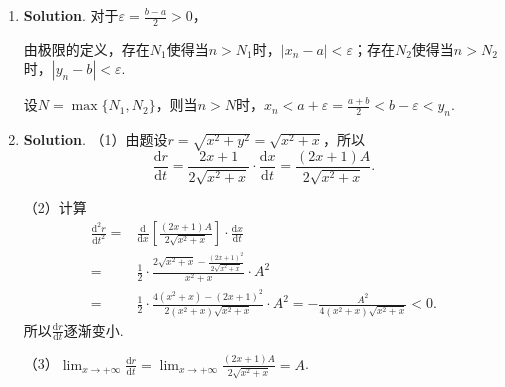 \documentclass[../main.tex]{subfiles}
\begin{document}
\begin{enumerate}
    \item \textbf{Solution}. 对于$\varepsilon=\frac{b-a}{2}>0$，

          由极限的定义，存在$N_{1}$使得当$n>N_{1}$时，$|x_{n}-a|<\varepsilon$；存在$N
                  _{2}$使得当$n>N_{2}$时，$|y_{n}-b|<\varepsilon$.

          设$N=\max\{N_{1},N_{2}\}$，则当$n>N$时，$x_{n}<a+\varepsilon=\frac{a+b}{2}<
              b-\varepsilon<y_{n}$.

    \item \textbf{Solution}. （1）由题设$r=\sqrt{x^{2}+y^{2}}=\sqrt{x^{2}+x}$，所以
          \[
              \frac{\mathrm{d}r}{\mathrm{d}t}=\frac{2x+1}{2\sqrt{x^{2}+x}}\cdot\frac{\mathrm{d}x}{\mathrm{d}t}=\frac{(2x+1)A}{2\sqrt{x^{2}+x}}.
          \]

          （2）计算
          \[
              \begin{aligned}
                  \frac{\mathrm{d}^2 r}{\mathrm{d}t^2}= {} & \frac{\mathrm{d}}{\mathrm{d}x}\left[\frac{(2x+1)A}{2\sqrt{x^2+x}}\right]\cdot\frac{\mathrm{d}x}{\mathrm{d}t}    \\
                  = {}                                     & \frac{1}{2}\cdot\frac{2\sqrt{x^2+x}-\frac{(2x+1)^2}{2\sqrt{x^2+x}}}{x^2+x}\cdot A^{2}                           \\
                  = {}                                     & \frac{1}{2}\cdot\frac{4(x^2+x)-(2x+1)^2}{2(x^2+x)\sqrt{x^2+x}}\cdot A^{2} = -\frac{A^2}{4(x^2+x)\sqrt{x^2+x}}<0.
              \end{aligned}
          \]
          所以$\frac{\mathrm{d}r}{\mathrm{d}t}$逐渐变小.

          （3）$\lim_{x\to+\infty}\frac{\mathrm{d}r}{\mathrm{d}t}=\lim_{x\to+\infty}\frac{(2x+1)A}{2\sqrt{x^{2}+x}}
              =A$.
\end{enumerate}
\end{document}
